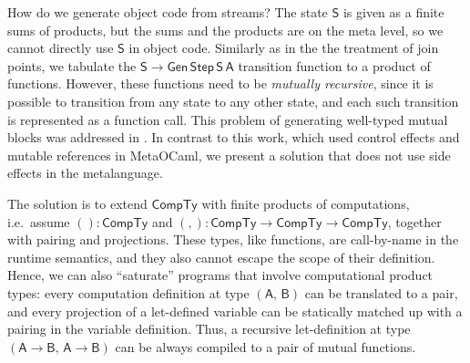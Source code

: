 \documentclass[acmsmall]{acmart}
\newcommand{\msf}[1]{{\mathsf{#1}}}
\newcommand{\vA}{\mathsf{A}}
\newcommand{\vB}{\mathsf{B}}
\newcommand{\vS}{\mathsf{S}}
\newcommand{\CTy}{\msf{CompTy}}
\theoremstyle{remark}
\newcommand{\Gen}{\msf{Gen}}
\newcommand{\Step}{\msf{Step}}
\begin{document}
How do we generate object code from streams? The state $\vS$ is given as a
finite sums of products, but the sums and the products are on the meta level, so
we cannot directly use $\vS$ in object code. Similarly as in the the treatment
of join points, we tabulate the $\vS \to \Gen\,\Step\,\vS\,\vA$ transition
function to a product of functions. However, these functions need to be
\emph{mutually recursive}, since it is possible to transition from any state to
any other state, and each such transition is represented as a function call.
This problem of generating well-typed mutual blocks was addressed in
\cite{DBLP:conf/pepm/YallopK19}. In contrast to this work, which used control
effects and mutable references in MetaOCaml, we present a solution that does not
use side effects in the metalanguage.


The solution is to extend $\CTy$ with finite products of computations,
i.e.\ assume $() : \CTy$ and $({,}) : \CTy \to \CTy \to \CTy$, together with
pairing and projections. These types, like functions, are call-by-name in the
runtime semantics, and they also cannot escape the scope of their definition.
Hence, we can also ``saturate'' programs that involve computational product types:
every computation definition at type $(\vA,\,\vB)$ can be translated to a pair,
and every projection of a let-defined variable can be statically matched up with
a pairing in the variable definition. Thus, a recursive let-definition at type
$(\vA \to \vB,\,\vA \to \vB)$ can be always compiled to a pair of mutual
functions.
\end{document}
